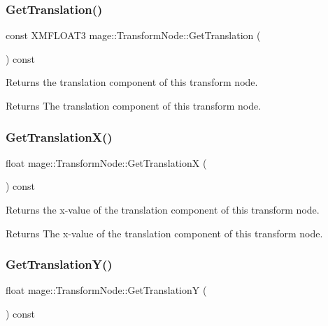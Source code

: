 \subsubsection{\texorpdfstring{Get\+Translation()}{GetTranslation()}}
{\footnotesize\ttfamily const X\+M\+F\+L\+O\+A\+T3 mage\+::\+Transform\+Node\+::\+Get\+Translation (\begin{DoxyParamCaption}{ }\end{DoxyParamCaption}) const\hspace{0.3cm}{\ttfamily [noexcept]}}

Returns the translation component of this transform node.

\begin{DoxyReturn}{Returns}
The translation component of this transform node. 
\end{DoxyReturn}
\hypertarget{structmage_1_1_transform_node_a5902ec9d6b67c1b7113a1f986fe869a2}{}\label{structmage_1_1_transform_node_a5902ec9d6b67c1b7113a1f986fe869a2} 
\subsubsection{\texorpdfstring{Get\+Translation\+X()}{GetTranslationX()}}
{\footnotesize\ttfamily float mage\+::\+Transform\+Node\+::\+Get\+TranslationX (\begin{DoxyParamCaption}{ }\end{DoxyParamCaption}) const\hspace{0.3cm}{\ttfamily [noexcept]}}

Returns the x-\/value of the translation component of this transform node.

\begin{DoxyReturn}{Returns}
The x-\/value of the translation component of this transform node. 
\end{DoxyReturn}
\hypertarget{structmage_1_1_transform_node_a8286ea3470a015fc04df4a9b9d1ae1bd}{}\label{structmage_1_1_transform_node_a8286ea3470a015fc04df4a9b9d1ae1bd} 
\subsubsection{\texorpdfstring{Get\+Translation\+Y()}{GetTranslationY()}}
{\footnotesize\ttfamily float mage\+::\+Transform\+Node\+::\+Get\+TranslationY (\begin{DoxyParamCaption}{ }\end{DoxyParamCaption}) const\hspace{0.3cm}{\ttfamily [noexcept]}}

